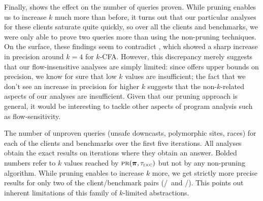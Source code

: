Finally,  shows the effect on the number of queries proven.
While pruning enables us to increase $k$ much more than before, it turns out
that our particular analyses for these clients saturate quite quickly, so
over all the clients and benchmarks,
we were only able to prove two queries more than using the non-pruning techniques.
On the surface, these findings seem to contradict \cite{liang10abstraction},
which showed a sharp increase in precision around $k=4$ for $k$-CFA.  However,
this discrepancy merely suggests that our flow-insensitive analyses are simply
limited: since \cite{liang10abstraction} offers upper bounds on precision, we know for
sure that low $k$ values are insufficient; the fact that we don't see an
increase in precision for higher $k$ suggests that the non-$k$-related aspects of our analyses
are insufficient.  Given that our pruning approach is general, it
would be interesting to tackle other aspects of program analysis such as
flow-sensitivity.

\begin{table}
\small
\centering

\caption{\label{tab:numUnproven} The number of unproven queries (unsafe
downcasts, polymorphic sites, races) for each of the clients and benchmarks
over the first five iterations.
All analyses obtain the exact results on iterations where they obtain an answer.
Bolded numbers refer to $k$ values reached by $\text{\sc pr}(\mbox{\boldmath$\pi$},\tau_{\text{\sc i} \times \text{\sc c}})$
but not by any non-pruning algorithm.
While pruning enables to increase $k$ more, we get strictly more precise results
for only two of the client/benchmark pairs (\downcast/\hedc\ and \downcast/\lusearch).
This points out inherent limitations of this family of $k$-limited abstractions.
}
\end{table}
